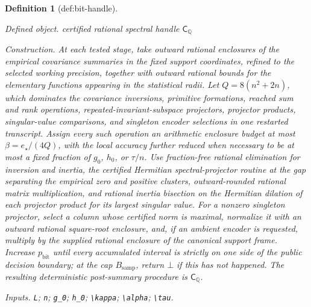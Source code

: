 \documentclass{article}
\newtheorem{definition}{Definition}
\begin{document}
\begin{definition}[def:bit-handle]\label{def:bit-handle}
\par\smallskip\noindent\emph{Defined object.} certified rational spectral handle \(\mathsf C_{\mathbb Q}\)
\par\smallskip\noindent\emph{Construction.} At each tested stage, take outward rational enclosures of the empirical covariance summaries in the fixed support coordinates, refined to the selected working precision, together with outward rational bounds for the elementary functions appearing in the statistical radii. Let \(Q=8(n^2+2n)\), which dominates the covariance inversions, primitive formations, reached sum and rank operations, repeated-invariant-subspace projectors, projector products, singular-value comparisons, and singleton encoder selections in one restarted transcript. Assign every such operation an arithmetic enclosure budget at most \(\beta=e_{\star}/(4Q)\), with the local accuracy further reduced when necessary to be at most a fixed fraction of \(g_0\), \(h_0\), or \(\tau/n\). Use fraction-free rational elimination for inversion and inertia, the certified Hermitian spectral-projector routine at the gap separating the empirical zero and positive clusters, outward-rounded rational matrix multiplication, and rational inertia bisection on the Hermitian dilation of each projector product for its largest singular value. For a nonzero singleton projector, select a column whose certified norm is maximal, normalize it with an outward rational square-root enclosure, and, if an ambient encoder is requested, multiply by the supplied rational enclosure of the canonical support frame. Increase \(p_{\mathrm{bit}}\) until every accumulated interval is strictly on one side of the public decision boundary; at the cap \(B_{\mathrm{samp}}\), return \(\bot\) if this has not happened. The resulting deterministic post-summary procedure is \(\mathsf C_{\mathbb Q}\).
\par\smallskip\noindent\emph{Inputs.} \texttt{L}; \texttt{n}; \texttt{g\_\allowbreak{}0}; \texttt{h\_\allowbreak{}0}; \texttt{\textbackslash{}\allowbreak{}kappa}; \texttt{\textbackslash{}\allowbreak{}alpha}; \texttt{\textbackslash{}\allowbreak{}tau}.
\end{definition}
\end{document}
